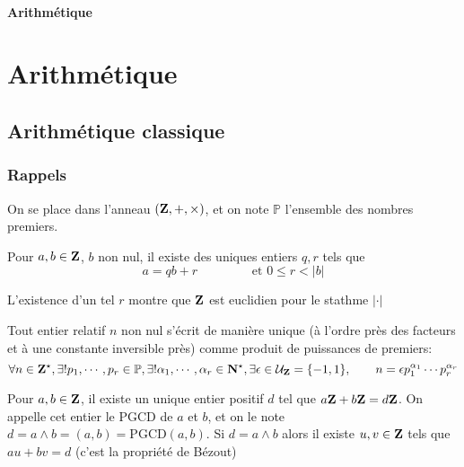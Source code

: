 \ifsolo
    ~

    \vspace{1cm}

    \begin{center}
        \textbf{\LARGE Arithmétique} \\[1em]
    \end{center}
    \tableofcontents
\else
    \chapter{Arithmétique}

    \minitoc
\fi
\thispagestyle{empty}

\ifsolo \newpage \setcounter{page}{1} \fi
\section{Arithmétique classique}

\subsection{Rappels}

On se place dans l'anneau $(\mathbf Z, +, \times)$, et on note $\mathbb P$ l'ensemble des nombres premiers.

\begin{thm}
     Pour $a, b\in\mathbf Z$, $b$ non nul, il existe des uniques entiers $q, r$ tels que \[
        a=qb+r\qquad \qquad \text{ et } 0\leq r<|b|
    \]
\end{thm}

\begin{rem}
    L'existence d'un tel $r$ montre que $\mathbf Z$ est euclidien pour le stathme $|\cdot|$
\end{rem}

\begin{thm}
    Tout entier relatif $n$ non nul s'écrit de manière unique (à l'ordre près des facteurs et à une constante inversible près) comme produit de puissances de premiers: \[
        \forall n\in\mathbf Z^\star, \exists! p_1, \cdots, p_r\in\mathbb P, \exists! \alpha_1, \cdots, \alpha_r\in\mathbf N^\star, \exists \epsilon\in\mathcal U_{\mathbf Z}=\{-1, 1\}, \qquad n=\epsilon p_1^{\alpha_1}\cdots p_r^{\alpha_r}
    \]
\end{thm}

\begin{thmdef}
    Pour $a, b\in\mathbf Z$, il existe un unique entier positif $d$ tel que $a\mathbf Z+b\mathbf Z=d\mathbf Z$. On appelle cet entier le PGCD de $a$ et $b$, et on le note $d=a\land b=(a, b)=\mathrm{PGCD}(a, b)$. Si $d=a\land b$ alors il existe $u, v\in \mathbf Z$ tels que $au+bv=d$ (c'est la  propriété de Bézout)
\end{thmdef}

